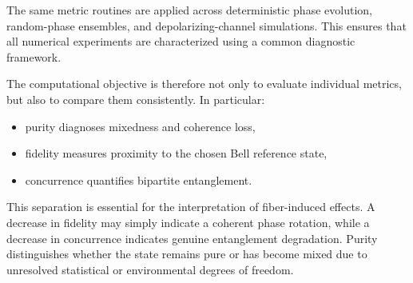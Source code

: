 The same metric routines are applied across deterministic phase evolution, random-phase ensembles, and depolarizing-channel simulations. This ensures that all numerical experiments are characterized using a common diagnostic framework.

\medskip

The computational objective is therefore not only to evaluate individual metrics, but also to compare them consistently. In particular:
\begin{itemize}
    \item purity diagnoses mixedness and coherence loss,
    \item fidelity measures proximity to the chosen Bell reference state,
    \item concurrence quantifies bipartite entanglement.
\end{itemize}

\medskip

This separation is essential for the interpretation of fiber-induced effects. A decrease in fidelity may simply indicate a coherent phase rotation, while a decrease in concurrence indicates genuine entanglement degradation. Purity distinguishes whether the state remains pure or has become mixed due to unresolved statistical or environmental degrees of freedom.
